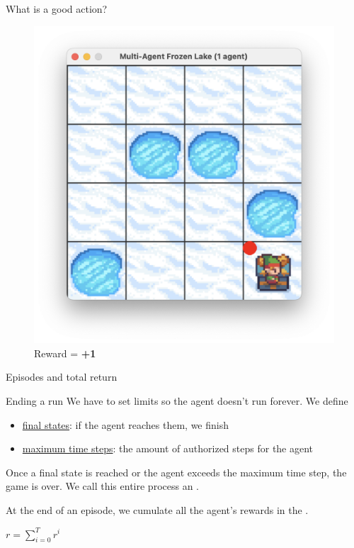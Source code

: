 \documentclass[aspectratio=169,xcolor=dvipsnames]{beamer}
\begin{document}
\begin{frame}{What is a good action?}
\begin{figure}[h!]
\begin{minipage}{0.45\textwidth}
            \includegraphics[scale=0.3]{images/goal-agent.png}
            \caption{Reward = \textbf{+1}}
        \end{minipage}
    \end{figure}
    
\end{frame}


\begin{frame}{Episodes and total return}

\begin{block}{Ending a run}
    We have to set limits so the agent doesn't run forever. We define
\vspace{10pt}
\begin{itemize}
    \item \underline{final states}: if the agent reaches them, we finish
    \item \underline{maximum time steps}: the amount of authorized steps for the agent
\end{itemize}
\vspace{10pt}
Once a final state is reached or the agent exceeds the maximum time step, the game is over. We call this entire process an .

\vspace{10pt}

At the end of an episode, we cumulate all the agent's rewards in the .

$r = \sum_{i=0}^T r^i$
\end{block}

\end{frame}
\end{document}
